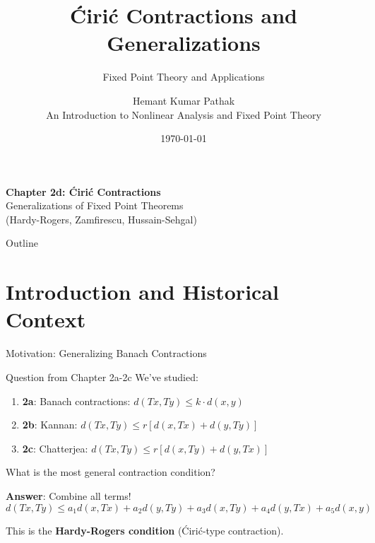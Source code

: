 \documentclass[aspectratio=169,10pt]{beamer}
\title[Ćirić Contractions]{Ćirić Contractions and Generalizations}
\subtitle{Fixed Point Theory and Applications}
\author[Pathak]{Hemant Kumar Pathak\\An Introduction to Nonlinear Analysis and Fixed Point Theory}
\date{\today}
\institute{Lecture Notes on Nonlinear Analysis}
\begin{document}
\begin{frame}
    \titlepage
    \vspace{0.5cm}
    \begin{center}
        \textbf{Chapter 2d: Ćirić Contractions}\\
        Generalizations of Fixed Point Theorems\\
        (Hardy-Rogers, Zamfirescu, Hussain-Sehgal)
    \end{center}
\end{frame}

\begin{frame}[allowframebreaks]{Outline}
    \tableofcontents
\end{frame}

\section{Introduction and Historical Context}

\begin{frame}{Motivation: Generalizing Banach Contractions}
    \begin{block}{Question from Chapter 2a-2c}
        We've studied:
        \begin{enumerate}
            \item \textbf{2a}: Banach contractions: $d(Tx, Ty) \leq k \cdot d(x,y)$
            \item \textbf{2b}: Kannan: $d(Tx, Ty) \leq r[d(x,Tx) + d(y,Ty)]$
            \item \textbf{2c}: Chatterjea: $d(Tx, Ty) \leq r[d(x,Ty) + d(y,Tx)]$
        \end{enumerate}

        What is the most general contraction condition?
    \end{block}

    \vspace{0.3cm}
    \textbf{Answer}: Combine all terms!
    \begin{equation*}
        d(Tx, Ty) \leq a_1 d(x,Tx) + a_2 d(y,Ty) + a_3 d(x,Ty) + a_4 d(y,Tx) + a_5 d(x,y)
    \end{equation*}

    This is the \textbf{Hardy-Rogers condition} (Ćirić-type contraction).
\end{frame}
\end{document}
